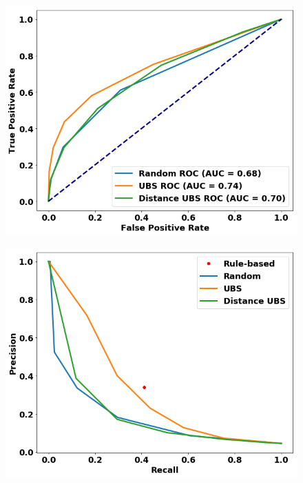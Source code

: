 \begin{figure}
\centering
\begin{minipage}[b]{.4\textwidth}
\includegraphics[trim=0in 0.1in 0.1in 0.in,clip,width=1.0\textwidth]{figures/rocs_lastround.png}
\captionsetup{labelformat=empty}
\label{fig:rocs_round5}
\end{minipage}\qquad
\hspace{2ex}
\begin{minipage}[b]{.4\textwidth}
\includegraphics[trim=0in 0.1in 0.1in 0.in,clip,width=1.0\textwidth]{figures/prcs_lastround.png}
\captionsetup{labelformat=empty}
\end{minipage}

\end{figure}
